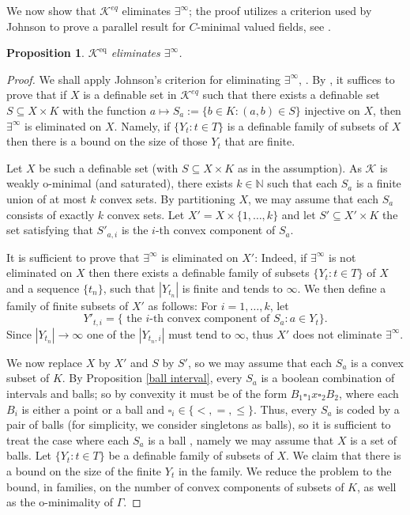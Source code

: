 \documentclass[11pt]{amsart}
\DeclareMathOperator{\eq}{eq}
\newtheorem{proposition}[theorem]{Proposition}
\theoremstyle{definition}
\newcommand{\Nn}{{\mathbb{N}}}
\newcommand{\CK}{{\mathcal K}}
\newcommand{\0}{\emptyset}
\def\sub{\subseteq}
\begin{document}
We now show that $\CK^{eq}$ eliminates $\exists^\infty$; the proof utilizes a criterion used by Johnson to prove a parallel result for $C$-minimal valued fields, see \cite{JohCminimalexist}.
\begin{proposition}\label{P:exists-infty V-min or T-conv}
    $\CK^{\eq}$ eliminates $\exists^\infty$.
\end{proposition}
\begin{proof} 
We shall apply Johnson's criterion for eliminating $\exists^\infty$, \cite{JohCminimalexist}.   By \cite[Theorem 2.3]{JohCminimalexist}, it suffices to prove that if $X$ is a definable set in $\CK^{eq}$ such that  there exists a definable set $S\subseteq X\times K$ with the function $a\mapsto S_a:=\{b\in K: (a,b)\in S\}$  injective on $X$, then $\exists^{\infty}$ is eliminated on $X$. Namely, if $\{Y_t:t\in T\}$ is a definable family of subsets of $X$ then there is a bound on the size of those $Y_t$ that are finite.

Let $X$ be such a definable set (with $S\sub X\times K$ as in the assumption). As $\CK$ is weakly o-minimal (and saturated), there exists $k\in \Nn$ such that each $S_a$ is a finite union of at most $k$ convex sets. By partitioning $X$, we may assume that each $S_a$ consists of exactly $k$ convex sets.  Let $X'=X\times \{1,\dots,k\}$ and let  $S'\subseteq X'\times K$ the set satisfying that $S'_{a,i}$ is the $i$-th convex component of $S_a$. 

    It is sufficient to prove that $\exists^\infty$ is eliminated on $X'$:  Indeed, if $\exists^\infty$ is not eliminated on $X$  then there exists a definable family of subsets $\{Y_t: t\in T\}$ of $X$ and a sequence $\{t_n\}$, such that $|Y_{t_n}|$ is finite and tends to $\infty$. We then define a family of finite subsets of $X'$ as follows: For $i=1,\dots, k$, let 
    \[Y'_{t,i}=\{\text{ the $i$-th convex component of $S_a: a\in Y_t$}\}.\] 
    Since $|Y_{t_n}|\to \infty$  one of the $|Y_{ t_n,i}|$ must tend to $\infty$, thus $X'$ does not eliminate $\exists^\infty$.

    We now replace $X$ by $X'$ and $S$ by $S'$, so we may assume that each $S_a$ is a convex subset of $K$. By Proposition \ref{ball interval}, 
        every $S_a$ is a boolean combination of intervals and balls; so by convexity it must be of the form $B_1\square_1 x\square_2 B_2$, where each $B_i$ is either a point or a ball and $\square_i\in \{<,=,\leq\}$.
        Thus, every $S_a$ is coded by a pair of balls (for simplicity, we consider singletons as balls), so it is sufficient to treat the case where each $S_a$ is a ball , namely we may assume that $X$ is a set of balls.
        Let $\{Y_t:t\in T\}$ be a definable family of subsets of $X$. We claim that there is a bound on the size of the finite $Y_t$ in the family. We reduce the problem to the bound, in families, on the number of convex components of subsets of $K$, as well as the o-minimality of $\Gamma$. 
    

\end{proof}
\end{document}
